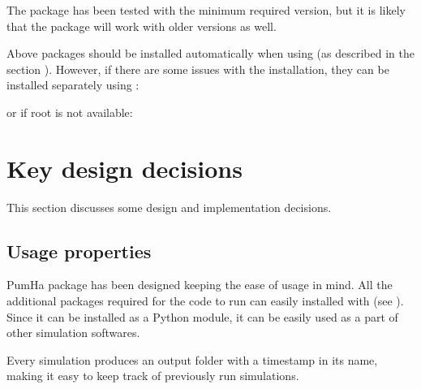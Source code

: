 \documentclass[letterpaper,10pt,english]{sphinxmanual}
\begin{document}
The package has been tested with the minimum required version, but it is likely that the package will work with older versions as well.

Above packages should be installed automatically when using  (as described in the section {\hyperref[\detokenize{index:how-to-install}]{}}). However, if there are some issues with the installation, they can be installed separately using :

\begin{sphinxVerbatim}[commandchars=\\\{\}]
    
\end{sphinxVerbatim}

or if root is not available:

\begin{sphinxVerbatim}[commandchars=\\\{\}]
   
\end{sphinxVerbatim}


\chapter{Key design decisions}
\label{\detokenize{index:key-design-decisions}}
This section discusses some design and implementation decisions.


\section{Usage properties}
\label{\detokenize{index:usage-properties}}
PumHa package has been designed keeping the ease of usage in mind. All the additional packages required for the code to run can easily installed with  (see {\hyperref[\detokenize{index:how-to-install}]{}}). Since it can be installed as a Python module, it can be easily used as a part of other simulation softwares.

Every simulation produces an output folder with a timestamp in its name, making it easy to keep track of previously run simulations.
\end{document}
